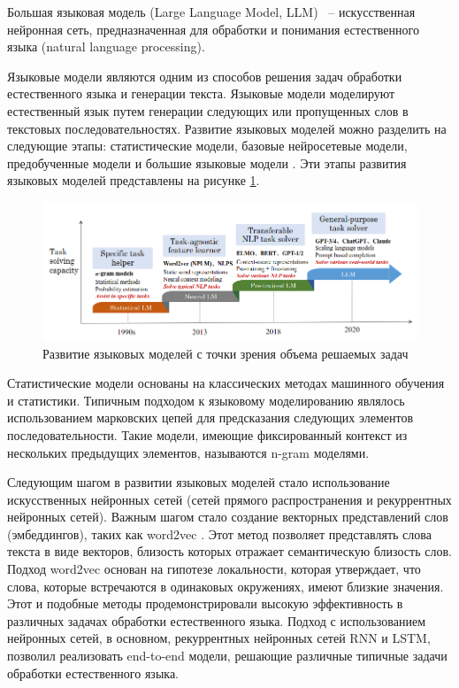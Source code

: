 Большая языковая модель (Large Language Model, LLM) ~-- искусственная нейронная сеть, предназначенная для обработки и понимания естественного языка (natural language processing).

Языковые модели являются одним из способов решения задач обработки естественного языка и генерации текста. Языковые модели моделируют естественный язык путем генерации следующих или пропущенных слов в текстовых последовательностях. Развитие языковых моделей можно разделить на следующие этапы: статистические модели, базовые нейросетевые модели, предобученные модели и большие языковые модели \cite{llm_survey}. Эти этапы развития языковых моделей представлены на рисунке \ref{img:llm_evolution}.

\begin{figure}[h]
    \centering
    \includegraphics[width=\linewidth]{../images/llm_evolution.png}
    \caption{Развитие языковых моделей с точки зрения объема решаемых задач\cite{llm_survey}}
    \label{img:llm_evolution}
\end{figure}

Статистические модели основаны на классических методах машинного обучения и статистики. Типичным подходом к языковому моделированию являлось использованием марковских цепей для предсказания следующих элементов последовательности. Такие модели, имеющие фиксированный контекст из нескольких предыдущих элементов, называются n-gram моделями.

Следующим шагом в развитии языковых моделей стало использование искусственных нейронных сетей (сетей прямого распространения и рекуррентных нейронных сетей). Важным шагом стало создание векторных представлений слов (эмбеддингов), таких как word2vec \cite{word2vec}. Этот метод позволяет представлять слова текста в виде векторов, близость которых отражает семантическую близость слов. Подход word2vec основан на гипотезе локальности, которая утверждает, что слова, которые встречаются в одинаковых окружениях, имеют близкие значения. Этот и подобные методы продемонстрировали высокую эффективность в различных задачах обработки естественного языка. Подход с использованием нейронных сетей, в основном, рекуррентных нейронных сетей RNN и LSTM, позволил реализовать end-to-end модели, решающие различные типичные задачи обработки естественного языка.

